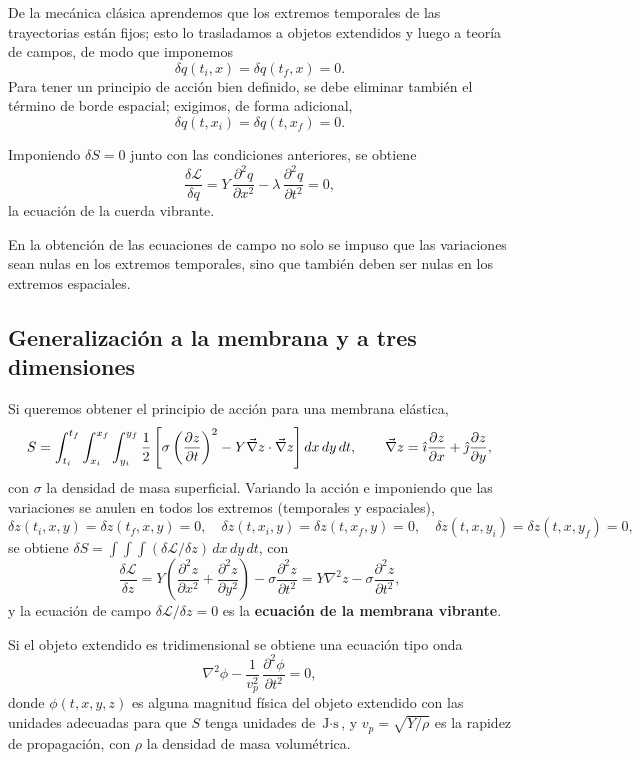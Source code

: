 De la mecánica clásica aprendemos que los extremos temporales de las
trayectorias están fijos; esto lo trasladamos a objetos extendidos y
luego a teoría de campos, de modo que imponemos
\[
\delta q(t_i,x) = \delta q(t_f,x) = 0 .
\]
Para tener un principio de acción bien definido, se debe eliminar
también el término de borde espacial; exigimos, de forma adicional,
\[
\delta q(t,x_i) = \delta q(t,x_f) = 0 .
\]

\begin{proposicionc}
Imponiendo $\delta S=0$ junto con las condiciones anteriores, se obtiene
\[
\frac{\delta\mathscr{L}}{\delta q} = Y\, \frac{\partial^2 q}{\partial
x^2} - \lambda\, \frac{\partial^2 q}{\partial t^2} = 0,
\]
la ecuación de la cuerda vibrante.
\end{proposicionc}

\begin{observacion}
En la obtención de las ecuaciones de campo no solo se impuso que las
variaciones sean nulas en los extremos temporales, sino que también
deben ser nulas en los extremos espaciales.
\end{observacion}

\subsection{Generalización a la membrana y a tres dimensiones}

Si queremos obtener el principio de acción para una membrana elástica,
\[
S = \int_{t_i}^{t_f}\int_{x_i}^{x_f}\int_{y_i}^{y_f} \frac12\left[
\sigma\left(\frac{\partial z}{\partial t}\right)^2 - Y\vec\nabla z\cdot
\vec\nabla z\right] dx\,dy\,dt, \qquad \vec\nabla z = \hat{\imath}
\frac{\partial z}{\partial x} + \hat{\jmath}\frac{\partial z}{\partial y},
\]
con $\sigma$ la densidad de masa superficial. Variando la acción e
imponiendo que las variaciones se anulen en todos los extremos
(temporales y espaciales),
\[
\delta z(t_i,x,y)=\delta z(t_f,x,y)=0, \quad \delta z(t,x_i,y)=\delta
z(t,x_f,y)=0, \quad \delta z(t,x,y_i)=\delta z(t,x,y_f)=0,
\]
se obtiene $\delta S = \int\int\int (\delta\mathscr{L}/\delta z)\,
dx\,dy\,dt$, con
\[
\frac{\delta\mathscr{L}}{\delta z} = Y\left(\frac{\partial^2 z}
{\partial x^2}+\frac{\partial^2 z}{\partial y^2}\right) - \sigma
\frac{\partial^2 z}{\partial t^2} = Y\nabla^2 z - \sigma\frac{\partial^2
z}{\partial t^2},
\]
y la ecuación de campo $\delta\mathscr{L}/\delta z=0$ es la
\textbf{ecuación de la membrana vibrante}.

Si el objeto extendido es tridimensional se obtiene una ecuación tipo
onda
\[
\nabla^2\phi - \frac{1}{v_p^2}\, \frac{\partial^2\phi}{\partial t^2} =
0,
\]
donde $\phi(t,x,y,z)$ es alguna magnitud física del objeto extendido con
las unidades adecuadas para que $S$ tenga unidades de $\text{J}\cdot
\text{s}$, y $v_p=\sqrt{Y/\rho}$ es la rapidez de propagación, con
$\rho$ la densidad de masa volumétrica.

